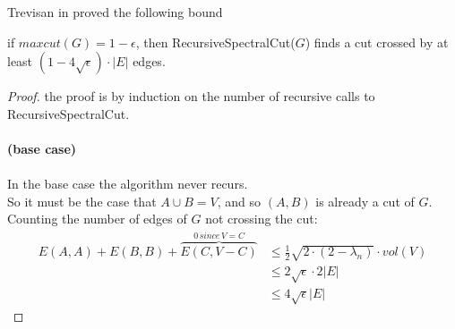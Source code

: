 Trevisan in \cite{trevi-1} proved the following bound
\begin{lemma} if $ maxcut(G) = 1-\epsilon$, then RecursiveSpectralCut($ G $) finds a cut crossed by at least $(1-4\sqrt{\epsilon})\cdot |E| $ edges.
	\begin{proof}
		the proof is by induction on the number of recursive calls to RecursiveSpectralCut.
		\\
		\\
		\textbf{(base case)}
		\\
		\\
		In the base case the algorithm never recurs. \\
		So it must be the case that $ A \cup B = V $, and so $ (A,B) $ is already a cut of $ G $. \\
		Counting the number of edges of $ G $ not crossing the cut:
		\begin{align*}
		E(A,A) + E(B,B) + \overbrace{E(C, V-C)}^{0\,since\, V=C} & \leq \frac{1}{2} \sqrt{2 \cdot (2-\lambda_n)} \cdot vol(V) \\
& \leq 2\sqrt{\epsilon} \cdot 2|E| \\
& \leq 4 \sqrt{\epsilon} |E|
		\end{align*}


\end{proof}
\end{lemma}
